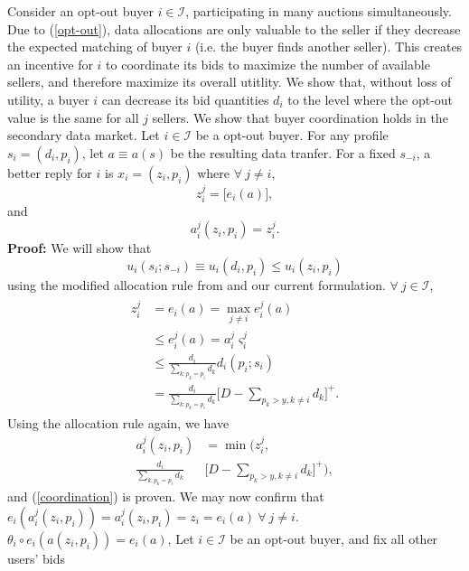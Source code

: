\documentclass[12pt]{article}
\theoremstyle{definition}
\newcommand{\vs}{\varsigma}
\begin{document}
\begin{multicols}{2}
Consider an opt-out buyer $i\in\mathcal{I}$, participating in many auctions
simultaneously. Due to (\ref{opt-out}), data allocations are only valuable to the
seller if they decrease the expected matching of buyer $i$ (i.e. the buyer finds another
seller). This creates an incentive for $i$ to coordinate its bids
to maximize the number of available sellers, and therefore maximize its overall
utitlity. We show that, without loss of utility, a buyer $i$ can decrease its
bid quantities $d_i$ to the level where the opt-out value is the same for all
$j$ sellers. We show that buyer coordination \cite{semret} holds in the
secondary data market.
{
 Let $i\in\mathcal{I}$ be a opt-out buyer.
For any profile $s_i = (d_i, p_i)$, let $a \equiv a(s)$ be the resulting data
tranfer. For a fixed $s_{-i}$, a better reply for $i$ is $x_i =
(z_i,p_i)$ where $\forall \ j \ne i$,
$$
    z_i^j = \big\lbrack e_i(a) \big\rbrack,
$$
and
\begin{equation}\label{coordination}
    a_i^j(z_i,p_i) = z_i^j.
\end{equation}
}
\textbf{Proof:} We will show that
\begin{equation}
    u_i(s_i;s_{-i}) \equiv u_i(d_i,p_i) \le u_i(z_i,p_i)
\end{equation}
using the modified allocation rule from \cite{tuffin} and our current
formulation. $\forall \ j \in \mathcal{I}$,
\begin{align}
\begin{split}
    z_i^j &= e_i(a) = \max_{j\ne i} e_i^j(a)\\
    & \le  e_i^j(a) = a_i^j\vs_i^j\\
    & \le \frac{d_i}{\sum_{k:p_k=p_i} d_k}d_i(p_i;s_i) \\
    & = \frac{d_i}{\sum_{k:p_k=p_i} d_k}\bigg[D-\displaystyle\sum_{p_k>y,k\ne
i} d_k\bigg]^+.
\end{split}
\end{align}
Using the allocation rule again, we have
\begin{align*}
    a_i^j(z_i,p_i) &= \min\bigg(z_i^j, \\
\frac{d_i}{\sum_{k:p_k=p_i} d_k}&\bigg[D-\displaystyle\sum_{p_k>y,k\ne
i} d_k\bigg]^+\bigg),
\end{align*}
and (\ref{coordination}) is proven. We may now confirm that $e_i(a_i^j(z_i,p_i)) = a_i^j(z_i,p_i)
= z_i = e_i(a) \ \forall \ j\ne i$.
$\theta_i\circ e_i(a(z_i, p_i)) = e_i(a)$, 
{
Let $i\in\mathcal{I}$ be an opt-out buyer, and fix all other users' bids
}
\end{multicols}
\end{document}

